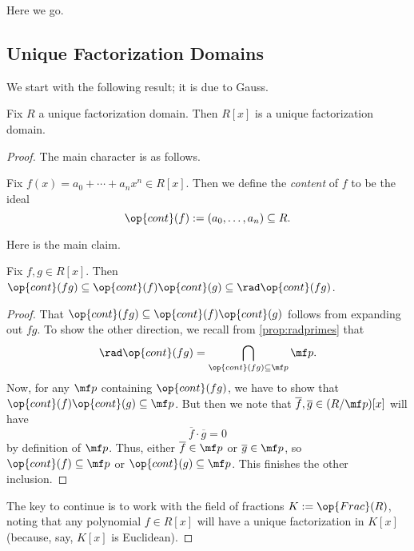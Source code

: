 
Here we go.

\subsection{Unique Factorization Domains}

We start with the following result; it is due to Gauss.
\begin{theorem} \label{thm:ch}
	Fix $R$ a unique factorization domain. Then $R[x]$ is a unique factorization domain.
\end{theorem}
\begin{proof}
	The main character is as follows.
	\begin{definition}[Content]
		Fix $f(x)=a_0+\cdots+a_nx^n\in R[x]$. Then we define the \textit{content} of $f$ to be the ideal
		\[\op{cont}(f):=(a_0,\ldots,a_n)\subseteq R.\]
	\end{definition}
	Here is the main claim.
	\begin{lemma}
		Fix $f,g\in R[x]$. Then $\op{cont}(fg)\subseteq\op{cont}(f)\op{cont}(g)\subseteq\rad\op{cont}(fg)$.
	\end{lemma}
	\begin{proof}
		That $\op{cont}(fg)\subseteq\op{cont}(f)\op{cont}(g)$ follows from expanding out $fg$. To show the other direction, we recall from \autoref{prop:radprimes} that
		\[\rad\op{cont}(fg)=\bigcap_{\op{cont}(fg)\subseteq\mf p}\mf p.\]
		Now, for any $\mf p$ containing $\op{cont}(fg)$, we have to show that $\op{cont}(f)\op{cont}(g)\subseteq\mf p$. But then we note that $\overline f,\overline g\in(R/\mf p)[x]$ will have
		\[\overline f\cdot\overline g=0\]
		by definition of $\mf p$. Thus, either $\overline f\in\mf p$ or $\overline g\in\mf p$, so $\op{cont}(f)\subseteq\mf p$ or $\op{cont}(g)\subseteq\mf p$. This finishes the other inclusion.
	\end{proof}
	The key to continue is to work with the field of fractions $K:=\op{Frac}(R)$, noting that any polynomial $f\in R[x]$ will have a unique factorization in $K[x]$ (because, say, $K[x]$ is Euclidean).


\end{proof}
